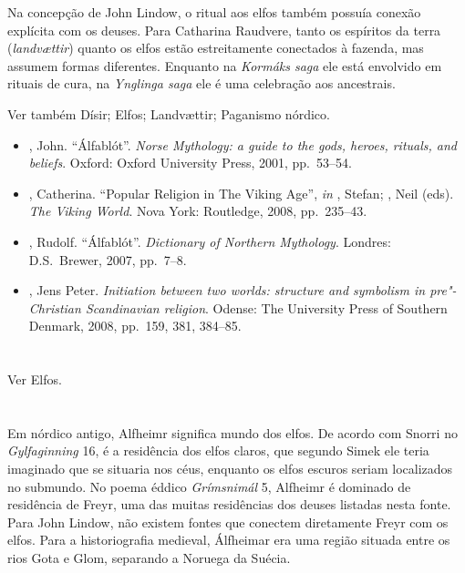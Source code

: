 Na concepção de John Lindow, o ritual aos elfos também possuía conexão
explícita com os deuses. Para Catharina Raudvere, tanto os espíritos da
terra (\emph{landvættir}) quanto os elfos estão estreitamente conectados
à fazenda, mas assumem formas diferentes. Enquanto na \emph{Kormáks
saga} ele está envolvido em rituais de cura, na \emph{Ynglinga saga} ele
é uma celebração aos ancestrais.

Ver também Dísir; Elfos; Landvættir; Paganismo nórdico.



\begin{itemize}\footnotesize
\item
  , John. ``Álfablót''. \emph{Norse Mythology: a guide to the gods,
  heroes, rituals, and beliefs}. Oxford: Oxford University Press, 2001,
  pp.~53--54.
\item
  , Catherina. ``Popular Religion in The Viking Age'', \emph{in}  ,
  Stefan; , Neil (eds). \emph{The Viking World}. Nova York:
  Routledge, 2008, pp.~235--43.
\item
  , Rudolf. ``Álfablót''. \emph{Dictionary of Northern Mythology}.
  Londres: D.S.~Brewer, 2007, pp.~7--8.
\item
  , Jens Peter. \emph{Initiation between two worlds: structure
  and symbolism in pre"-Christian Scandinavian religion}. Odense: The
  University Press of Southern Denmark, 2008, pp.~159, 381, 384--85.
\end{itemize}

\section{}

Ver Elfos.

\section{}

Em nórdico antigo, Alfheimr significa mundo dos elfos. De acordo com
Snorri no \emph{Gylfaginning} 16, é a residência dos elfos claros, que
segundo Simek ele teria imaginado que se situaria nos céus, enquanto os
elfos escuros seriam localizados no submundo. No poema éddico
\emph{Grímsnimál} 5, Alfheimr é dominado de residência de Freyr, uma das
muitas residências dos deuses listadas nesta fonte. Para John Lindow,
não existem fontes que conectem diretamente Freyr com os elfos. Para a
historiografia medieval, Álfheimar era uma região situada entre os rios
Gota e Glom, separando a Noruega da Suécia.

